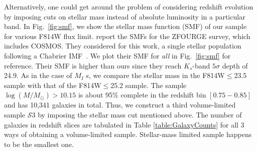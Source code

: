 \documentclass[twocolumn,useAMS,usenatbib]{mn2e}
\newcommand{\s}{\ensuremath{\mathcal{S}}}
\begin{document}


Alternatively, one could get around the problem of considering redshift evolution by imposing cuts on stellar mass instead of absolute luminosity in a particular band. In Fig.~\ref{fig:smf}, we show the stellar mass function (SMF) of our sample for various F814W flux limit.
\cite{Tomczak_SMF} report the SMFs for the ZFOURGE survey, which includes COSMOS. They considered for this work, a single stellar population following a Chabrier IMF~\citep{ChabrierIMF}. 
We plot their SMF for \emph{all} in Fig.~\ref{fig:smf} for
reference. Their SMF is higher than ours since they reach $K_s$-band
$5\sigma$ depth of 24.9. 
As in the case of $M_I$ s, we compare the stellar mass in the F814W$\le$23.5 sample with that of the F814W$\le$25.2 sample. 
The sample $\log(M/M_\odot) > 10.15$ is about 95\% complete in the redshift bin $\left[ 0.75 - 0.85\right]$ and has 10,341 galaxies in total.
Thus, we construct a third volume-limited sample \s$3$ by imposing the stellar mass cut mentioned above. The number of galaxies in redshift slices
are tabulated in Table \ref{table:GalaxyCounts} for all 3 ways of obtaining a volume-limited sample. Stellar-mass limited sample happens to be the smallest one.
\end{document}
